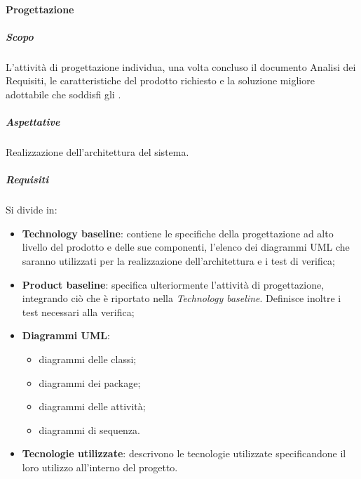 			\paragraph{Progettazione}	
				\subparagraph{Scopo}
				L'attività di progettazione individua, una volta concluso il documento Analisi dei Requisiti, le caratteristiche del prodotto richiesto e la soluzione migliore adottabile che soddisfi gli . 
				\subparagraph{Aspettative}
				Realizzazione dell'architettura del sistema.
				\subparagraph{Requisiti}
				Si divide in:
				\begin{itemize}
					\item \textbf{Technology baseline}: contiene le specifiche della progettazione ad alto livello del prodotto e delle sue componenti, l'elenco dei diagrammi UML che saranno utilizzati per la realizzazione dell'architettura e i test di verifica;
					\item \textbf{Product baseline}: specifica ulteriormente l'attività di progettazione, integrando ciò che è riportato nella \textit{Technology baseline}. Definisce inoltre i test necessari alla verifica;
					\item \textbf{Diagrammi UML}:
					\begin{itemize}
						\item diagrammi delle classi;
						\item diagrammi dei package;
						\item diagrammi delle attività;
						\item diagrammi di sequenza.
					\end{itemize}
					\item \textbf{Tecnologie utilizzate}: descrivono le tecnologie utilizzate specificandone il loro utilizzo all'interno del progetto.
				\end{itemize}			

